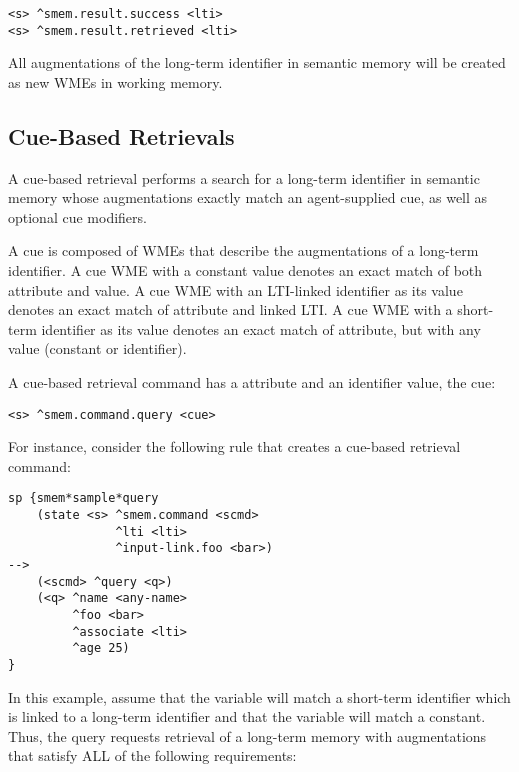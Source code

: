 \begin{verbatim}
<s> ^smem.result.success <lti>
<s> ^smem.result.retrieved <lti>
\end{verbatim}

All augmentations of the long-term identifier in semantic memory will be created as new WMEs in working memory.

\subsection{Cue-Based Retrievals}

A cue-based retrieval performs a search for a long-term identifier in semantic memory whose augmentations exactly match an agent-supplied cue, as well as optional cue modifiers.

A cue is composed of WMEs that describe the augmentations of a long-term identifier.  
A cue WME with a constant value denotes an exact match of both attribute and value.  
A cue WME with an LTI-linked identifier as its value denotes an exact match of attribute and linked LTI.  
A cue WME with a short-term identifier as its value denotes an exact match of attribute, but with any value (constant or identifier).  

A cue-based retrieval command has a  attribute and an identifier value, the cue:

\begin{verbatim}
<s> ^smem.command.query <cue>
\end{verbatim}

For instance, consider the following rule that creates a cue-based retrieval command:

\begin{verbatim}
sp {smem*sample*query
    (state <s> ^smem.command <scmd>
               ^lti <lti>
               ^input-link.foo <bar>)
-->
    (<scmd> ^query <q>)
    (<q> ^name <any-name>
         ^foo <bar>
         ^associate <lti>
         ^age 25)
}
\end{verbatim}

In this example, assume that the  variable will match a short-term identifier which is linked to a long-term identifier and that the  variable will match a constant.  
Thus, the query requests retrieval of a long-term memory with augmentations that satisfy ALL of the following requirements:

